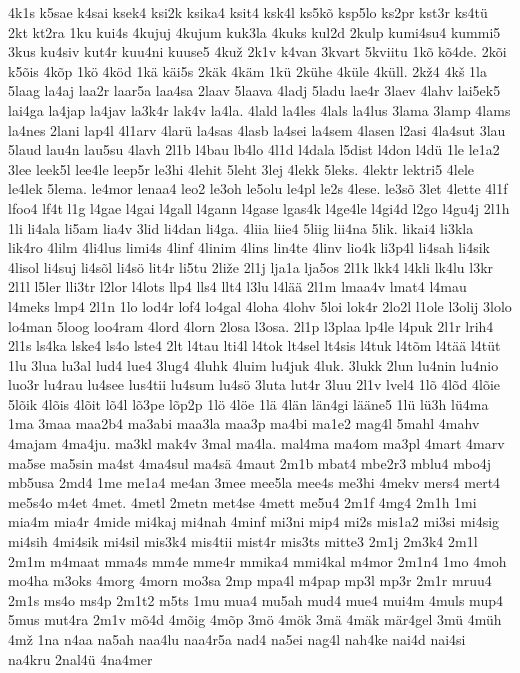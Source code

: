 {4k1s
k5sae
k4sai
ksek4
ksi2k
ksika4
ksit4
ksk4l
ks5kõ
ksp5lo
ks2pr
kst3r
ks4tü
2kt
kt2ra
1ku
kui4s
4kujuj
4kujum
kuk3la
4kuks
kul2d
2kulp
kumi4su4
kummi5
3kus
ku4siv
kut4r
kuu4ni
kuuse5
4kuž
2k1v
k4van
3kvart
5kviitu
1kõ
kõ4de.
2kõi
k5õis
4kõp
1kö
4köd
1kä
käi5s
2käk
4käm
1kü
2kühe
4küle
4küll.
2kž4
4kš
1la
5laag
la4aj
laa2r
laar5a
laa4sa
2laav
5laava
4ladj
5ladu
lae4r
3laev
4lahv
lai5ek5
lai4ga
la4jap
la4jav
la3k4r
lak4v
la4la.
4lald
la4les
4lals
la4lus
3lama
3lamp
4lams
la4nes
2lani
lap4l
4l1arv
4larü
la4sas
4lasb
la4sei
la4sem
4lasen
l2asi
4la4sut
3lau
5laud
lau4n
lau5su
4lavh
2l1b
l4bau
lb4lo
4l1d
l4dala
l5dist
l4don
l4dü
1le
le1a2
3lee
leek5l
lee4le
leep5r
le3hi
4lehit
5leht
3lej
4lekk
5leks.
4lektr
lektri5
4lele
le4lek
5lema.
le4mor
lenaa4
leo2
le3oh
le5olu
le4pl
le2s
4lese.
le3sõ
3let
4lette
4l1f
lfoo4
lf4t
l1g
l4gae
l4gai
l4gall
l4gann
l4gase
lgas4k
l4ge4le
l4gi4d
l2go
l4gu4j
2l1h
1li
li4ala
li5am
lia4v
3lid
li4dan
li4ga.
4liia
liie4
5liig
lii4na
5lik.
likai4
li3kla
lik4ro
4lilm
4li4lus
limi4s
4linf
4linim
4lins
lin4te
4linv
lio4k
li3p4l
li4sah
li4sik
4lisol
li4suj
li4sõl
li4sö
lit4r
li5tu
2liže
2l1j
lja1a
lja5os
2l1k
lkk4
l4kli
lk4lu
l3kr
2l1l
l5ler
lli3tr
l2lor
l4lots
llp4
lls4
llt4
l3lu
l4lää
2l1m
lmaa4v
lmat4
l4mau
l4meks
lmp4
2l1n
1lo
lod4r
lof4
lo4gal
4loha
4lohv
5loi
lok4r
2lo2l
l1ole
l3olij
3lolo
lo4man
5loog
loo4ram
4lord
4lorn
2losa
l3osa.
2l1p
l3plaa
lp4le
l4puk
2l1r
lrih4
2l1s
ls4ka
lske4
ls4o
lste4
2lt
l4tau
lti4l
l4tok
lt4sel
lt4sis
l4tuk
l4tõm
l4tää
l4tüt
1lu
3lua
lu3al
lud4
lue4
3lug4
4luhk
4luim
lu4juk
4luk.
3lukk
2lun
lu4nin
lu4nio
luo3r
lu4rau
lu4see
lus4tii
lu4sum
lu4sö
3luta
lut4r
3luu
2l1v
lvel4
1lõ
4lõd
4lõie
5lõik
4lõis
4lõit
lõ4l
lõ3pe
lõp2p
1lö
4löe
1lä
4län
län4gi
lääne5
1lü
lü3h
lü4ma
1ma
3maa
maa2b4
ma3abi
maa3la
maa3p
ma4bi
ma1e2
mag4l
5mahl
4mahv
4majam
4ma4ju.
ma3kl
mak4v
3mal
ma4la.
mal4ma
ma4om
ma3pl
4mart
4marv
ma5se
ma5sin
ma4st
4ma4sul
ma4sä
4maut
2m1b
mbat4
mbe2r3
mblu4
mbo4j
mb5usa
2md4
1me
me1a4
me4an
3mee
mee5la
mee4s
me3hi
4mekv
mers4
mert4
me5s4o
m4et
4met.
4metl
2metn
met4se
4mett
me5u4
2m1f
4mg4
2m1h
1mi
mia4m
mia4r
4mide
mi4kaj
mi4nah
4minf
mi3ni
mip4
mi2s
mis1a2
mi3si
mi4sig
mi4sih
4mi4sik
mi4sil
mis3k4
mis4tii
mist4r
mis3ts
mitte3
2m1j
2m3k4
2m1l
2m1m
m4maat
mma4s
mm4e
mme4r
mmika4
mmi4kal
m4mor
2m1n4
1mo
4moh
mo4ha
m3oks
4morg
4morn
mo3sa
2mp
mpa4l
m4pap
mp3l
mp3r
2m1r
mruu4
2m1s
ms4o
ms4p
2m1t2
m5ts
1mu
mua4
mu5ah
mud4
mue4
mui4m
4muls
mup4
5mus
mut4ra
2m1v
mõ4d
4mõig
4mõp
3mö
4mök
3mä
4mäk
mär4gel
3mü
4müh
4mž
1na
n4aa
na5ah
naa4lu
naa4r5a
nad4
na5ei
nag4l
nah4ke
nai4d
nai4si
na4kru
2nal4ü
4na4mer
}
